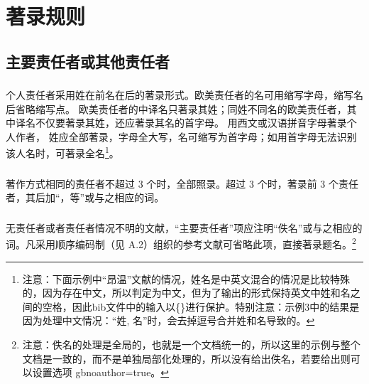 \documentclass{article}
\begin{document}
\section{著录规则}
\subsection{主要责任者或其他责任者}
\subsubsection{} 个人责任者采用姓在前名在后的著录形式。欧美责任者的名可用缩写字母，缩写名后省略缩写点。
欧美责任者的中译名只著录其姓；同姓不同名的欧美责任者，其中译名不仅要著录其姓，还应著录其名的首字母。 用西文或汉语拼音字母著录个人作者， 姓应全部著录，字母全大写，名可缩写为首字母；如用首字母无法识别该人名时，可著录全名\footnote{注意：下面示例中“昂温”文献的情况，姓名是中英文混合的情况是比较特殊的，因为存在中文，所以判定为中文，但为了输出的形式保持英文中姓和名之间的空格，因此bib文件中的输入以\{\}进行保护。特别注意：示例3中的结果是因为处理中文情况：“姓, 名”时，会去掉逗号合并姓和名导致的。}。

\begin{refsection}

\nocite{李时珍--}
\nocite{乔纳斯--}
\nocite{昂温1988--}
\nocite{GPS1988--}
\nocite{丸山敏秋--}
\nocite{凯西尔--}
\nocite{Einstein--}
\nocite{Williams-ellis--}
\nocite{morgan--}
\nocite{lijianning--a}
\nocite{lijianning--b}

{}
\end{refsection}

\subsubsection{}  著作方式相同的责任者不超过 3 个时，全部照录。超过 3 个时，著录前 3 个责任者，其后加“，等”或与之相应的词。
\begin{refsection}
\nocite{钱学森--}
\nocite{李四光--}
\nocite{印森林--}
\nocite{fordham--}

{}
\end{refsection}

\subsubsection{} 无责任者或者责任者情况不明的文献，“主要责任者”项应注明“佚名”或与之相应的词。凡采用顺序编码制（见 A.2）组织的参考文献可省略此项，直接著录题名。\footnote{注意：佚名的处理是全局的，也就是一个文档统一的，所以这里的示例与整个文档是一致的，而不是单独局部化处理的，所以没有给出佚名，若要给出则可以设置选项 gbnoauthor=true。}
\end{document}
